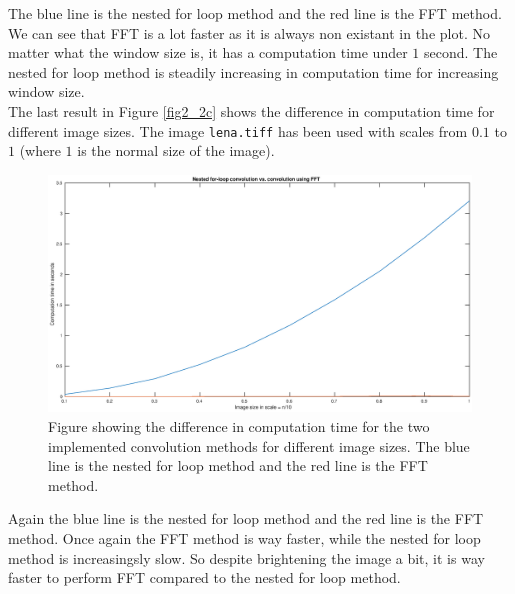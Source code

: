 \documentclass[a4paper]{article}
\begin{document}
The blue line is the nested for loop method and the red line is the FFT method. We can see that FFT is a lot faster as it is always non existant in the plot. No matter what the window size is, it has a computation time under $1$ second. The nested for loop method is steadily increasing in computation time for increasing window size. \\
The last result in Figure \ref{fig2_2c} shows the difference in computation time for different image sizes. The image \texttt{lena.tiff} has been used with scales from $0.1$ to $1$ (where $1$ is the normal size of the image).
\begin{figure}[H]
  \centering
  \captionsetup{justification=centering}
  \includegraphics[width=\textwidth]{fig2_3.eps}
  \caption{Figure showing the difference in computation time for the two implemented convolution methods for different image sizes. The blue line is the nested for loop method and the red line is the FFT method.}
  \label{fig2_2b}
\end{figure}
Again the blue line is the nested for loop method and the red line is the FFT method. Once again the FFT method is way faster, while the nested for loop method is increasingsly slow. So despite brightening the image a bit, it is way faster to perform FFT compared to the nested for loop method.
\end{document}
